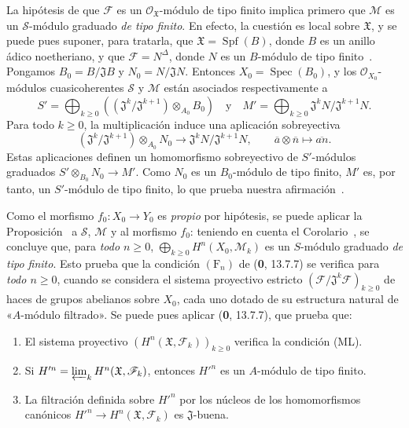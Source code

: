 \begingroup
{}
La hipótesis de que $\mathcal F$ es un $\mathcal O_{\mathfrak X}$-módulo de tipo finito implica primero que $\mathcal M$ es
un $\mathcal S$-módulo graduado \emph{de tipo finito}.
En efecto, la cuestión es local sobre $\mathfrak X$, y se puede pues suponer, para tratarla, que $\mathfrak X=\operatorname{Spf}(B)$, donde $B$ es un anillo ádico noetheriano, y que $\mathcal F=N^\Delta$, donde $N$ es un $B$-módulo de tipo finito~.
Pongamos $B_0=B/\mathfrak J B$ y $N_0=N/\mathfrak JN$.
Entonces $X_0=\operatorname{Spec}(B_0)$, y los $\mathcal O_{X_0}$-módulos cuasicoherentes $\mathcal S$ y $\mathcal M$ están asociados respectivamente a
\[
S'=\bigoplus_{k\geq0}
((\mathfrak J^k/\mathfrak J^{k+1})\otimes_{A_0}B_0)\quad\text{y}\quad
M'=\bigoplus_{k\geq0}\mathfrak J^kN/\mathfrak J^{k+1}N.
\]
Para todo $k\geq0$, la multiplicación induce una aplicación sobreyectiva
\[
(\mathfrak J^k/\mathfrak J^{k+1})\otimes_{A_0}N_0
\longrightarrow\mathfrak J^kN/\mathfrak J^{k+1}N,
\qquad \overline a\otimes\overline n\longmapsto\overline{an}.
\]
Estas aplicaciones definen un homomorfismo sobreyectivo de $S'$-módulos graduados $S'\otimes_{B_0}N_0\longrightarrow M'$.
Como $N_0$ es un $B_0$-módulo de tipo finito, $M'$ es, por tanto, un $S'$-módulo de tipo finito, lo que prueba nuestra afirmación~.
\par\endgroup

Como el morfismo $f_0:X_0\to Y_0$ es \emph{propio} por hipótesis, se puede aplicar la Proposición~ a $\mathcal S$, $\mathcal M$ y al morfismo $f_0$: teniendo en cuenta el Corolario~, se concluye que, para \emph{todo $n\geq0$}, $\bigoplus_{k\geq0}H^n(X_0,\mathcal M_k)$ es un $S$-módulo graduado \emph{de
tipo finito}. Esto prueba que la condición $(\mathrm F_n)$ de (\textbf{0}, 13.7.7) se
verifica para \emph{todo $n\geq0$}, cuando se considera el sistema proyectivo estricto $(\mathcal F/\mathfrak J^k\mathcal F)_{k\geq0}$ de haces de grupos abelianos sobre $X_0$, cada uno dotado de su estructura natural de «$A$-módulo filtrado». Se puede pues aplicar (\textbf{0}, 13.7.7), que prueba que:
\begin{enumerate}
\item[$1^\circ$] El sistema proyectivo
$(H^n(\mathfrak X,\mathcal F_k))_{k\geq0}$ verifica la condición (ML).
\item[$2^\circ$] Si
$H'^{n}=\varprojlim_kH^n(\mathfrak X,\mathcal F_k)$, entonces $H'^{n}$ es un $A$-módulo de tipo finito.
\item[$3^\circ$] La filtración definida sobre $H'^{n}$ por los núcleos de los homomorfismos canónicos $H'^{n}\to H^n(\mathfrak X,\mathcal F_k)$ es $\mathfrak J$-buena.
\end{enumerate}

